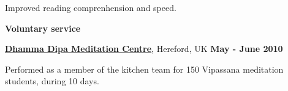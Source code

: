\begin{innerlist}
\item Improved reading comprenhension and speed.
\end{innerlist}

\halfblankline

\textbf{Voluntary service}

\begin{outerlist}
\item[\FA \faAngleDoubleRight] \href{http://www.dipa.dhamma.org/}{\textbf{Dhamma
Dipa Meditation Centre}}, Hereford, UK%
        \hfill \textbf{May - June 2010}
\end{outerlist}

\begin{innerlist}
\item Performed as a member of the kitchen team for 150 Vipassana meditation
students, during 10 days.
\end{innerlist}

% 

% 
% 
% 

